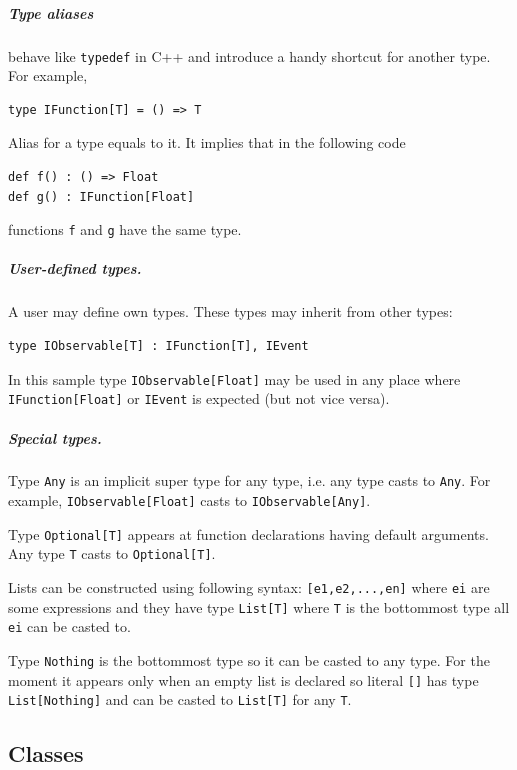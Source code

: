 \documentclass[a4paper,11pt]{article}
\begin{document}
\subparagraph{Type aliases} behave like \texttt{typedef} in C++ and introduce a handy
shortcut for another type. For example,

\begin{verbatim}
type IFunction[T] = () => T
\end{verbatim}

Alias for a type equals to it. It implies that in the following code

\begin{verbatim}
def f() : () => Float
def g() : IFunction[Float]
\end{verbatim}

functions \texttt{f} and \texttt{g} have the same type.

\subparagraph{User-defined types.}


A user may define own types. These types may inherit from other types:

\begin{verbatim}
type IObservable[T] : IFunction[T], IEvent
\end{verbatim}

In this sample type \texttt{IObservable{[}Float{]}} may be used in any
place where \texttt{IFunction{[}Float{]}} or \texttt{IEvent} is expected
(but not vice versa).

\subparagraph{Special types.}


Type \texttt{Any} is an implicit super type for any type, i.e. any type
casts to \texttt{Any}. For example, \texttt{IObservable{[}Float{]}}
casts to \texttt{IObservable{[}Any{]}}.

Type \texttt{Optional{[}T{]}} appears at function declarations having
default arguments. Any type \texttt{T} casts to
\texttt{Optional{[}T{]}}.

Lists can be constructed using following syntax:
\texttt{{[}e1,e2,...,en{]}} where \texttt{ei} are some expressions and
they have type \texttt{List{[}T{]}} where \texttt{T} is the bottommost
type all \texttt{ei} can be casted to.

Type \texttt{Nothing} is the bottommost type so it can be casted to any
type. For the moment it appears only when an empty list is declared so
literal \texttt{{[}{]}} has type \texttt{List{[}Nothing{]}} and can be
casted to \texttt{List{[}T{]}} for any \texttt{T}.

\subsection{Classes}
\end{document}
